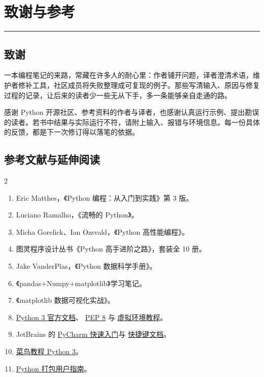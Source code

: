 \chapter{致谢与参考}

{\color{PyBlue}\rule{\textwidth}{0.9pt}}

\begingroup
{}

\section*{致谢}

一本编程笔记的来路，常藏在许多人的耐心里：作者铺开问题，译者澄清术语，维护者修补工具，社区成员将失败整理成可复现的例子。那些写清输入、原因与修复过程的记录，让后来的读者少一些无从下手，多一条能够亲自走通的路。

感谢 Python 开源社区、参考资料的作者与译者，也感谢认真运行示例、提出勘误的读者。若书中结果与实际运行不符，请附上输入、报错与环境信息。每一份具体的反馈，都是下一次修订得以落笔的依据。

\section*{参考文献与延伸阅读}

\setlength{\columnsep}{9mm}
\setlength{\multicolsep}{3pt}
\begin{multicols}{2}
  \small
  \raggedright
  \setlength{\leftmargini}{1.9em}
  \renewcommand{\labelenumi}{\textcolor{PyBlue}{[\arabic{enumi}]}}
  \begin{enumerate}
    \setlength{\itemsep}{3pt}
    \setlength{\parsep}{0pt}
    \item Eric Matthes，《Python 编程：从入门到实践》第 3 版。
    \item Luciano Ramalho，《流畅的 Python》。
    \item Micha Gorelick、Ian Ozsvald，《Python 高性能编程》。
    \item 图灵程序设计丛书《Python 高手进阶之路》，套装全 10 册。
    \item Jake VanderPlas，《Python 数据科学手册》。
    \item 《pandas+Numpy+matplotlib》学习笔记。
    \item 《matplotlib 数据可视化实战》。
    \item \href{https://docs.python.org/zh-cn/3/}{Python 3 官方文档}、
      \href{https://peps.python.org/pep-0008/}{PEP 8} 与
      \href{https://docs.python.org/zh-cn/3/tutorial/venv.html}{虚拟环境教程}。
    \item JetBrains 的
      \href{https://www.jetbrains.com/help/pycharm/quick-start-guide.html}{PyCharm 快速入门}与
      \href{https://www.jetbrains.com/help/pycharm/mastering-keyboard-shortcuts.html}{快捷键文档}。
    \item \href{https://www.runoob.com/python3}{菜鸟教程 Python 3}。
    \item \href{https://packaging.python.org/en/latest/tutorials/packaging-projects/}{Python 打包用户指南}。
  \end{enumerate}
\end{multicols}

